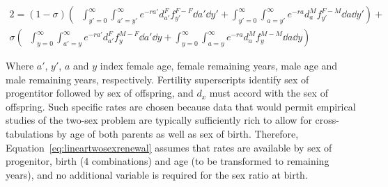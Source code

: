 \begin{equation}
\label{eq:lineartwosexrenewal}
\begin{split}
2 = (1 - \sigma) \left(\;\;
            \int _{y'=0}^\infty \int _{a'=y'}^\infty e^{-ra'}
                      d_{a'}^F f_{y'}^{F-F} \dd a' \dd y' + 
            \int _{y'=0}^\infty \int _{a=y'}^\infty e^{-ra}
                      d_{a}^M f_{y'}^{F-M} \dd a \dd y'\right) + \\ 
     \sigma \left(\;\;
            \int _{y=0}^\infty \int _{a'=y}^\infty e^{-ra'}
                      d_{a'}^F f_{y}^{M-F} \dd a' \dd y + 
            \int _{y=0}^\infty \int _{a=y}^\infty e^{-ra}
                      d_{a}^M f_{y}^{M-M} \dd a \dd y \right)
\end{split}
\end{equation}

Where $a'$, $y'$, $a$ and $y$ index female age, female remaining years, male age
and male remaining years, respectively. Fertility superscripts identify sex of
progentitor followed by sex of offspring, and $d_x$ must accord with the sex of
offspring. Such specific rates are chosen because data that would permit
empirical studies of the two-sex problem are typically sufficiently rich to 
allow for cross-tabulations by age of both parents as well as sex of birth.
Therefore, Equation~\eqref{eq:lineartwosexrenewal} assumes that rates are
available by sex of progenitor, birth (4 combinations) and age (to be transformed to remaining years), 
and no additional variable is required for the sex ratio at birth. 

